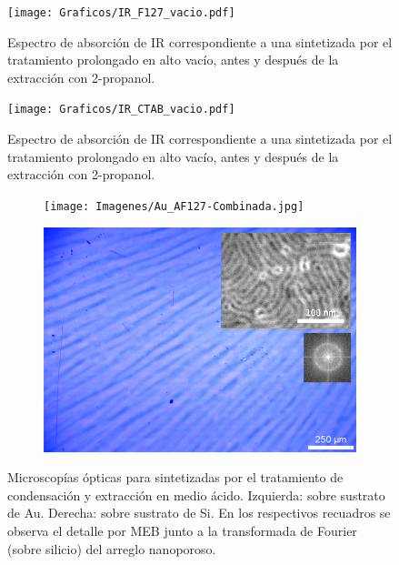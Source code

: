          \begin{figure}
			 	\centering
			 	\texttt{[image: Graficos/IR\_F127\_vacio.pdf]}
			 	\caption[FTIR \pdmF\space tratamiento prolongado.]{Espectro de absorción de IR correspondiente a una \pdmF\space sintetizada por el tratamiento prolongado en alto vacío, antes y después de la extracción con 2-propanol.}
			 	\label{fig:IR_F127_vacio}
			    \end{figure}
					
		 \begin{figure}
			 	\centering
			 	\texttt{[image: Graficos/IR\_CTAB\_vacio.pdf]}
			 	\caption[FTIR \pdmC\space tratamiento prolongado.]{Espectro de absorción de IR correspondiente a una \pdmC\space sintetizada por el tratamiento prolongado en alto vacío, antes y después de la extracción con 2-propanol.}
			 	\label{fig:IR_CTAB_vacio}
			 	\end{figure}

    	
    	
     	     \begin{figure}
	 	   	    \begin{subfigure}{0.495\textwidth}
		       	\texttt{[image: Imagenes/Au\_AF127-Combinada.jpg]}
		   		\end{subfigure}
		   		\begin{subfigure}{0.495\textwidth}
		   	    \includegraphics[width=\textwidth]{Imagenes/Si_AF127-Combinada.jpg}
		   		\end{subfigure}
				 \caption[Microscopía óptica \pdmF tratamiento en medio ácido.]{Microscopías ópticas para \pdmF\space sintetizadas por el tratamiento de condensación y extracción en medio ácido. Izquierda: sobre sustrato de Au. Derecha: sobre sustrato de Si. En los respectivos recuadros se observa el detalle por MEB junto a la transformada de Fourier (sobre silicio) del arreglo nanoporoso.}
				 \label{fig:Microscopia_F127_acido}	
			     \end{figure}
   		
